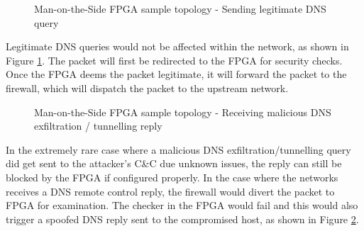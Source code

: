 \documentclass[a4paper]{report}
\begin{document}
\begin{figure}[H]
  \caption{Man-on-the-Side FPGA sample topology - Sending legitimate DNS query}
  \label{fig:man-on-the-side-FPGA-send-legit}
\end{figure}

Legitimate DNS queries would not be affected within the network, as shown in Figure \ref{fig:man-on-the-side-FPGA-send-legit}. The packet will first be redirected to the FPGA for security checks. Once the FPGA deems the packet legitimate, it will forward the packet to the firewall, which will dispatch the packet to the upstream network. 

\begin{figure}[H]
  \caption{Man-on-the-Side FPGA sample topology - Receiving malicious DNS exfiltration / tunnelling reply}
  \label{fig:man-on-the-side-FPGA-recv-malicious}
\end{figure}

In the extremely rare case where a malicious DNS exfiltration/tunnelling query did get sent to the attacker's C\&C due unknown issues, the reply can still be blocked by the FPGA if configured properly. In the case where the networks receives a DNS remote control reply, the firewall would divert the packet to FPGA for examination. The checker in the FPGA would fail and this would also trigger a spoofed DNS reply sent to the compromised host, as shown in Figure \ref{fig:man-on-the-side-FPGA-recv-malicious}.
\end{document}
